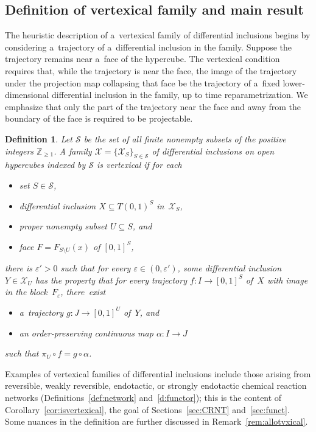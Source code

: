 \documentclass[pdftex]{sigma}
\newtheorem{Definition}[Theorem]{Definition}
\begin{document}
\subsection{Definition of vertexical family and main result}
\label{sub:main}

The heuristic description of a~vertexical family of dif\/ferential inclusions begins by considering a~trajectory of
a~dif\/ferential inclusion in the family.
Suppose the trajectory remains near a~face of the hypercube.
The vertexical condition requires that, while the trajectory is near the face, the image of the trajectory under the
projection map collapsing that face be the trajectory of a~f\/ixed lower-dimensional dif\/ferential inclusion in the
family, up to time reparametrization.
We emphasize that only the part of the trajectory near the face and away from the boundary of the face is required to
be projectable.
\begin{Definition}\label{d:vertexical}
Let $\mathcal S$ be the set of all f\/inite nonempty subsets of the positive integers $\mathbb{Z}_{\geq1}$.
A family $\mathcal X=\{\mathcal X_S\}_{S\in\mathcal S}$ of dif\/ferential inclusions on open hypercubes indexed by
$\mathcal S$ is \emph{vertexical} if for each
\begin{itemize}\itemsep=-0.5pt
\item set $S\in\mathcal S$, \item dif\/ferential inclusion $X\subseteq T(0,1)^S$ in~$\mathcal X_S$, \item proper
nonempty subset $U\subseteq S$, and \item face $F=F_{S\setminus U}(x)$ of $[0,1]^S$,
\end{itemize}
there is $\varepsilon'>0$ such that for every $\varepsilon\in(0,\varepsilon')$, some dif\/ferential inclusion
$Y\in\mathcal X_U$ has the property that for every trajectory $f:I\to[0,1]^S$ of~$X$ with image in the
block~$F_\varepsilon$, there~exist
\begin{itemize}\itemsep=0pt
\item a~trajectory $g:J\to[0,1]^U$ of~$Y$, and \item an order-preserving continuous map $\alpha:I\to J$
\end{itemize}
such that $\pi_U\circ f=g\circ\alpha$.
\end{Definition}

Examples of vertexical families of dif\/ferential inclusions include those arising from reversible, weakly reversible,
endotactic, or strongly endotactic chemical reaction networks  (Def\/initions~\ref{def:network} and~\ref{d:functor});
this is the content of Corollary~\ref{cor:isvertexical}, the goal of Sections~\ref{sec:CRNT} and~\ref{sec:funct}.
Some nuances in the def\/inition are further discussed in Remark~\ref{rem:allotvxical}.
\end{document}

